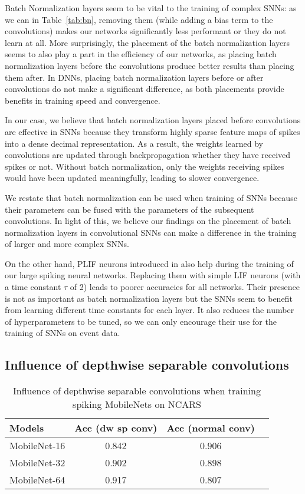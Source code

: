 \documentclass[conference]{IEEEtran}
\begin{document}
Batch Normalization layers seem to be vital to the training of complex SNNs: as we can in Table~\ref{tab:bn}, removing them (while adding a bias term to the convolutions) makes our networks significantly less performant or they do not learn at all. More surprisingly, the placement of the batch normalization layers seems to also play a part in the efficiency of our networks, as placing batch normalization layers before the convolutions produce better results than placing them after. In DNNs, placing batch normalization layers before or after convolutions do not make a significant difference, as both placements provide benefits in training speed and convergence.

In our case, we believe that batch normalization layers placed before convolutions are effective in SNNs because they transform highly sparse feature maps of spikes into a dense decimal representation. As a result, the weights learned by convolutions are updated through backpropagation whether they have received spikes or not. Without batch normalization, only the weights receiving spikes would have been updated meaningfully, leading to slower convergence.

We restate that batch normalization can be used when training of SNNs because their parameters can be fused with the parameters of the subsequent convolutions. In light of this, we believe our findings on the placement of batch normalization layers in convolutional SNNs can make a difference in the training of larger and more complex SNNs.

On the other hand, PLIF neurons introduced in \cite{plif} also help during the training of our large spiking neural networks. Replacing them with simple LIF neurons (with a time constant $\tau$ of 2) leads to poorer accuracies for all networks.
Their presence is not as important as batch normalization layers but the SNNs seem to benefit from learning different time constants for each layer. It also reduces the number of hyperparameters to be tuned, so we can only encourage their use for the training of SNNs on event data.

\subsection{Influence of depthwise separable convolutions\label{dw}}

\begin{table}[]
\renewcommand{\arraystretch}{1.3}
\centering
\caption{Influence of depthwise separable convolutions when training spiking MobileNets on NCARS}
\begin{tabular}{lccc}
\hline
\textbf{Models}     & \textbf{Acc (dw sp conv)} & \textbf{Acc (normal conv)}  \\ \hline
MobileNet-16 & 0.842 & 0.906                       \\ 
MobileNet-32 & 0.902 & 0.898                      \\ 
MobileNet-64 & 0.917 & 0.807                \\ 
\hline
\end{tabular}
\label{tab:dwconv}
\end{table}
\end{document}
